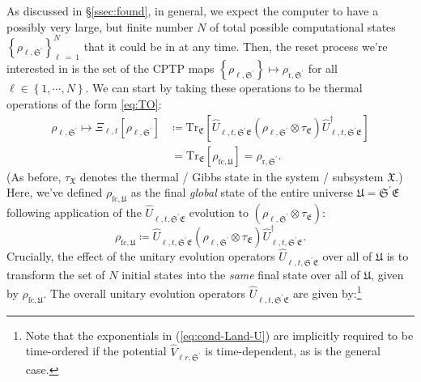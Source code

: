\documentclass[preprints,article,accept,moreauthors,pdftex]{Definitions/mdpi}
\begin{document}
\begin{paracol}{2}
As discussed in \S\ref{ssec:found}, in general, we expect the computer to have a possibly very large, but finite number $N$ of total possible computational states $\left\{\rho_{\ell,\mathfrak{S}^{\prime}}\right\}_{\ell\:=\:1}^{N}$ that it could be in at any time. Then, the reset process we're interested in is the set of the CPTP maps $\left\{\rho_{\ell,\mathfrak{S}^{\prime}}\right\} \mapsto \rho_{\mathrm{r},\mathfrak{S}^{\prime}}$ for all $\ell \in \left\{1,\cdots, N\right\}$. We can start by taking these operations to be thermal operations of the form \eqref{eq:TO}:
\begin{equation}
    \label{eq:cond-Land-TO}
    \begin{split}
        \rho_{\ell,\mathfrak{S}^{\prime}} \mapsto \Xi_{\ell,t}\left[\rho_{\ell,\mathfrak{S}^{\prime}}\right] &\coloneqq \mathrm{Tr}_{\mathfrak{E}} \left[ \widehat{U}_{\ell,t,\mathfrak{S^\prime E}} \left( \rho_{\ell,\mathfrak{S}^{\prime}} \otimes \tau_{\mathfrak{E}} \right) \widehat{U}_{\ell,t,\mathfrak{S^\prime E}}^{\dagger} \right] \\[4pt]
        &\,= \mathrm{Tr}_{\mathfrak{E}} \left[ \rho_{\mathrm{f}\mathrm{c},\mathfrak{U}} \right]= \rho_{\mathrm{r},\mathfrak{S}^{\prime}}.
    \end{split}
\end{equation}
(As before, $\tau_{\mathfrak{X}}$ denotes the thermal / Gibbs state in the system / subsystem $\mathfrak{X}$.) Here, we've defined $\rho_{\mathrm{f}\mathrm{c},\mathfrak{U}}$ as the final \emph{global} state of the entire universe $\mathfrak{U} = \mathfrak{S^\prime E}$ following application of the $\widehat{U}_{\ell,t,\mathfrak{S^\prime E}}$ evolution to $\left(\rho_{\ell,\mathfrak{S}^{\prime}}\otimes\tau_{\mathfrak{E}}\right)$:
\begin{equation}
    \label{eq:cond-Land-final-global-state}
    \rho_{\mathrm{f}\mathrm{c},\mathfrak{U}} \coloneqq \widehat{U}_{\ell,t,\mathfrak{S^\prime E}} \left( \rho_{\ell,\mathfrak{S}^{\prime}} \otimes \tau_{\mathfrak{E}} \right) \widehat{U}_{\ell,t,\mathfrak{S^\prime E}}^{\dagger}.
\end{equation}
Crucially, the effect of the unitary evolution operators $\widehat{U}_{\ell,t,\mathfrak{S^\prime E}}$ over all of $\mathfrak{U}$ is to transform the set of $N$ initial states into the \emph{same} final state over all of $\mathfrak{U}$, given by $\rho_{\mathrm{f}\mathrm{c},\mathfrak{U}}$. The overall unitary evolution operators $\widehat{U}_{\ell,t,\mathfrak{S^\prime E}}$ are given by:\footnote{Note that the exponentials in (\ref{eq:cond-Land-U}) are implicitly required to be time-ordered if the potential $\widehat{V}_{\ell r,\mathfrak{S}^{\prime}}$ is time-dependent, as is the general case.}

\end{paracol}
\end{document}
